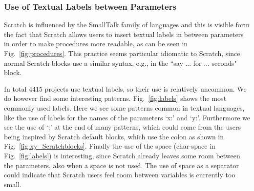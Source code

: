 \documentclass[conference]{IEEEtran}
\begin{document}
\subsubsection{Use of Textual Labels between Parameters}

Scratch is influenced by the SmallTalk family of languages and this is visible form the fact that Scratch allows users to insert textual labels in between parameters in order to make procedures more readable, as can be seen in Fig.~\ref{fig:procedures}.
This practice seems particular idiomatic to Scratch, since normal Scratch blocks use a similar syntax, e.g., in the ``say ... for ... seconds" block. 

In total 4415 projects use textual labels, so their use is relatively uncommon. We do however find some interesting patterns. 
Fig.~\ref{fig:labels} shows the most commonly used labels. Here we see some patterns common in textual languages, like the use of labels for the names of the parameters `x:' and `y:'. 
Furthermore we see the use of `:' at the end of many patterns, which could come from the users being inspired by Scratch default blocks, which use the colon as shown in Fig.~\ref{fig:xy_Scratchblocks}. 
Finally the use of the space (char-space in Fig.~\ref{fig:labels}) is interesting, since Scratch already leaves some room between the parameters, also when a space is not used. 
The use of space as a separator could indicate that Scratch users feel room between variables is currently too small.
\end{document}
